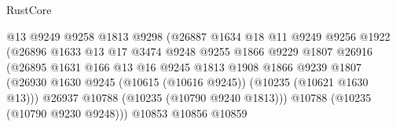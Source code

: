 \begin{lexlean}{RustCore}
\begin{coremodule}
                                            @13
                                            @9249
                                            @9258
                                            @1813
                                            @9298
                                            (@26887
                                              @1634
                                              @18
                                              @11
                                              @9249
                                              @9256
                                              @1922
                                              (@26896
                                                @1633
                                                @13
                                                @17
                                                @3474
                                                @9248
                                                @9255
                                                @1866
                                                @9229
                                                @1807
                                                @26916
                                                (@26895
                                                  @1631
                                                  @166
                                                  @13
                                                  @16
                                                  @9245
                                                  @1813
                                                  @1908
                                                  @1866
                                                  @9239
                                                  @1807
                                                  (@26930
                                                    @1630
                                                    @9245
                                                    (@10615 (@10616 @9245))
                                                    (@10235 (@10621 @1630 @13)))
                                                  @26937
                                                  @10788
                                                  (@10235 (@10790 @9240 @1813)))
                                                @10788
                                                (@10235 (@10790 @9230 @9248)))
                                              @10853
                                              @10856
                                              @10859

\end{coremodule}
\end{lexlean}

